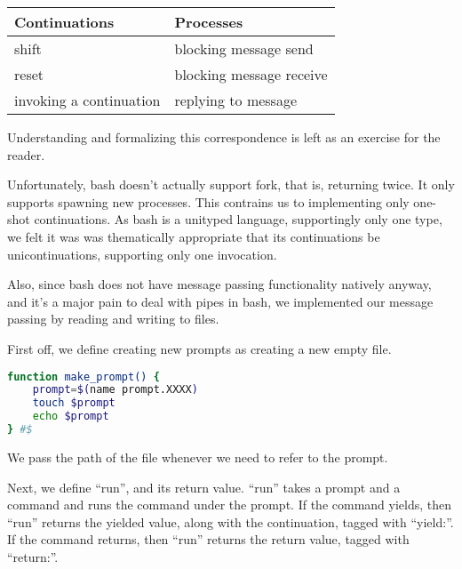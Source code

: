\documentclass[sigplan]{acmart}
\begin{document}
\begin{tabular}{ll}
Continuations & Processes\\
\hline
shift & blocking message send\\
reset & blocking message receive\\
invoking a continuation & replying to message\\
\end{tabular}
\begin{comment}
#+ORGTBL: SEND proccont orgtbl-to-latex :splice nil :skip 0
| Continuations                      | Processes                                         |
|------------------------------------+---------------------------------------------------|
| shift                              | blocking message send                             |
| reset                              | spawn process, blocking message receive           |
| invoking a one-shot continuation   | replying to message                               |
| invoking a multi-shot continuation | replying to message so that the remote side forks |
\end{comment}

Understanding and formalizing this correspondence is left as an exercise for the reader.

Unfortunately, bash doesn't actually support fork, that is, returning twice.
It only supports spawning new processes.
This contrains us to implementing only one-shot continuations.
As bash is a unityped language, supportingly only one type,
we felt it was was thematically appropriate that its continuations be unicontinuations,
supporting only one invocation.

Also, since bash does not have message passing functionality natively anyway,
and it's a major pain to deal with pipes in bash,
we implemented our message passing by reading and writing to files.

First off, we define creating new prompts as creating a new empty file.

\begin{lstlisting}[language=bash]
function make_prompt() {
    prompt=$(name prompt.XXXX)
    touch $prompt
    echo $prompt
} #$
\end{lstlisting}

We pass the path of the file whenever we need to refer to the prompt.

Next, we define ``run'', and its return value.
``run'' takes a prompt and a command and runs the command under the prompt.
If the command yields,
then ``run'' returns the yielded value, along with the continuation, tagged with ``yield:''.
If the command returns,
then ``run'' returns the return value, tagged with ``return:''.
\end{document}
